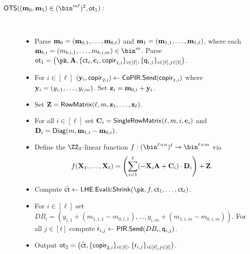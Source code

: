 \begin{description}
\item[$\OTS((\vc{m}_0,\vc{m}_1) \in (\bin^{m \ell})^2,\ot_1):$]~
\begin{itemize}
    \item Parse $\mathbf{m}_0 = (\mathbf{m}_{0,1},\dots,\mathbf{m}_{0,\ell})$ and $\mathbf{m}_1 = (\mathbf{m}_{1,1},\dots,\mathbf{m}_{1,\ell})$, where each $\vc{m}_{b,i} =(m_{b,i,1},\dots, m_{b,i,m})\in \bin^m$. Parse $\ot_1=\left(\pk,\vc{A},\{\ct_i, \vc{c}_i,\copir_{1,i}\}_{i\in [\ell]},\{\quer_{i,j}\}_{i \in [\ell], j \in [t]}\right)$.
    \item For $i \in [\ell]$ $(\mathbf{y}_i,\mathsf{copir}_{2,i})\gets \mathsf{CoPIR}.\mathsf{Send}(\mathsf{copir}_{1,i})$ where $\mathbf{y}_i=(y_{i,1},\dots, y_{i,m})$. Set $\mathbf{z}_i = \mathbf{m}_{0,i} + \mathbf{y}_i$.
    \item Set $\mathbf{Z} = \mathsf{RowMatrix}(\ell,m,\mathbf{z}_1,\dots,\mathbf{z}_\ell)$.
    \item For all $i \in [\ell]$ set $\mathbf{C}_i = \mathsf{SingleRowMatrix}(\ell,m,i,\mathbf{c}_i)$ and $\mathbf{D}_i = \mathsf{Diag}(m,\mathbf{m}_{1,i} - \mathbf{m}_{0,i})$.
    \item Define the $\ZZ_2$-linear function $f: (\bin^{\ell \times n})^\ell \to \bin^{\ell \times m}$ via
    \[
    f(\mathbf{X}_1,\dots,\mathbf{X}_\ell)=\left( \sum_{i = 1}^\ell (-\mathbf{X}_i\mathbf{A} + \mathbf{C}_i)\cdot \mathbf{D}_i \right) + \mathbf{Z}.
    \]
    \item Compute $\tilde \ct \gets \LHE.\evalshrink(\pk,f,\ct_1,\dots,\ct_\ell)$.
    \item For $i \in [\ell]$ set ${DB}_i=(y_{i,1}+(m_{1,i,1}-m_{0,i,1}),\dots,y_{i,m}+(m_{1,i,m}-m_{0,i,m}) )$. For all $j \in [t]$  compute $\mathsf{r}_{i,j} \gets \mathsf{PIR}.\mathsf{Send}(DB_{i},\mathsf{q}_{i,j})$.
    \item Output $\mathsf{ot}_2=\left(\tilde{\mathsf{ct}},\{\mathsf{copir}_{2,i}\}_{i\in[\ell]}, \{\mathsf{r}_{i,j}\}_{i \in [\ell], j \in [t]} \right)$.
\end{itemize}


\end{description}
